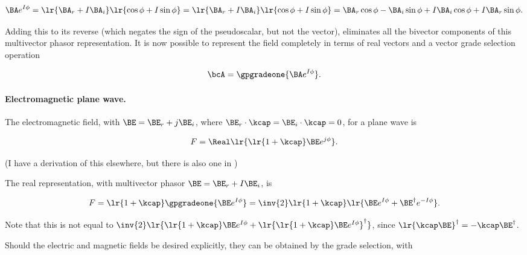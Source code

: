 \begin{dmath}\label{eqn:ellipticalWaves:80}
\BA e^{I \phi}
=
\lr{ \BA_r + I \BA_i }
\lr{ \cos\phi + I \sin\phi }
=
\lr{ \BA_r + I \BA_i }
\lr{ \cos\phi + I \sin\phi }
=
\BA_r \cos\phi - \BA_i \sin\phi
+ I \BA_i \cos\phi + I \BA_r \sin\phi.
\end{dmath}

Adding this to its reverse (which negates the sign of the pseudoscalar, but not the vector), eliminates all the bivector components of this multivector phasor representation.  It is now possible to represent the field completely in terms of real vectors and a vector grade selection operation

\begin{dmath}\label{eqn:ellipticalWaves:100}
\bcA = \gpgradeone{ \BA e^{I \phi } }.
\end{dmath}

\paragraph{Electromagnetic plane wave.}

The electromagnetic field, with \( \BE = \BE_r + j \BE_i \), where \( \BE_r \cdot \kcap = \BE_i \cdot \kcap = 0 \), for a plane wave is

\begin{dmath}\label{eqn:ellipticalWaves:140}
   F = \Real \lr{ \lr{ 1 + \kcap } \BE e^{j \phi} }.
\end{dmath}

(I have a derivation of this elsewhere, but there is also one in \citep{doran2003gap})

The real representation, with multivector phasor \( \BE = \BE_r + I \BE_i \), is

\begin{dmath}\label{eqn:ellipticalWaves:160}
F
=
\lr{ 1 + \kcap } \gpgradeone{ \BE e^{I \phi } }
=
\inv{2} \lr{ 1 + \kcap } \lr{ \BE e^{I \phi } + \BE^\dagger e^{-I \phi } }.
\end{dmath}

Note that this is not equal to \(
\inv{2} \lr{
   \lr{ 1 + \kcap } \BE e^{I \phi }
   +
\lr{ \lr{ 1 + \kcap } \BE e^{I \phi } }^\dagger } \), since \( \lr{ \kcap \BE }^\dagger = -\kcap \BE^\dagger \).

Should the electric and magnetic fields be desired explicitly, they can be obtained by the grade selection, with

